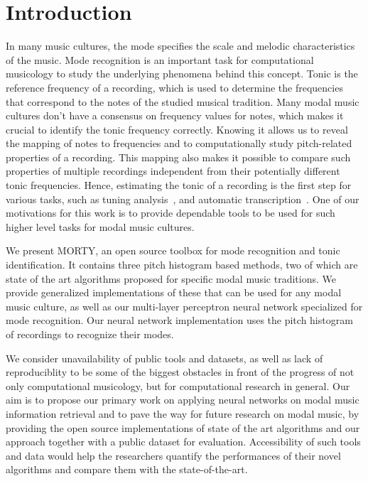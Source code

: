 \documentclass{sig-alternate}
\begin{document}

\printccsdesc


\section{Introduction}\label{sec:introduction}
In many music cultures, the mode specifies the scale and melodic characteristics of the music. Mode recognition is an important task for computational musicology to study the underlying phenomena behind this concept. Tonic is the reference frequency of a recording, which is used to determine the frequencies that correspond to the notes of the studied musical tradition. Many modal music cultures don't have a consensus on frequency values for notes, which makes it crucial to identify the tonic frequency correctly. Knowing it allows us to reveal the mapping of notes to frequencies and to computationally study pitch-related properties of a recording. This mapping also makes it possible to compare such properties of multiple recordings independent from their potentially different tonic frequencies. Hence, estimating the tonic of a recording is the first step for various tasks, such as tuning analysis~\cite{tuning}, and automatic transcription~\cite{transcription}. One of our motivations for this work is to provide dependable tools to be used for such higher level tasks for modal music cultures.

We present MORTY, an open source toolbox for mode recognition and tonic identification. It contains three pitch histogram based methods, two of which are state of the art algorithms proposed for specific modal music traditions. We provide generalized implementations of these that can be used for any modal music culture, as well as our multi-layer perceptron neural network specialized for mode recognition. Our neural network implementation uses the pitch histogram of recordings to recognize their modes.

We consider unavailability of public tools and datasets, as well as lack of reproduciblity to be some of the biggest obstacles in front of the progress of not only computational musicology, but for computational research in general. Our aim is to propose our primary work on applying neural networks on modal music information retrieval and to pave the way for future research on modal music, by providing the open source implementations of state of the art algorithms and our approach together with a public dataset for evaluation. Accessibility of such tools and data would help the researchers quantify the performances of their novel algorithms and compare them with the state-of-the-art.
\end{document}
